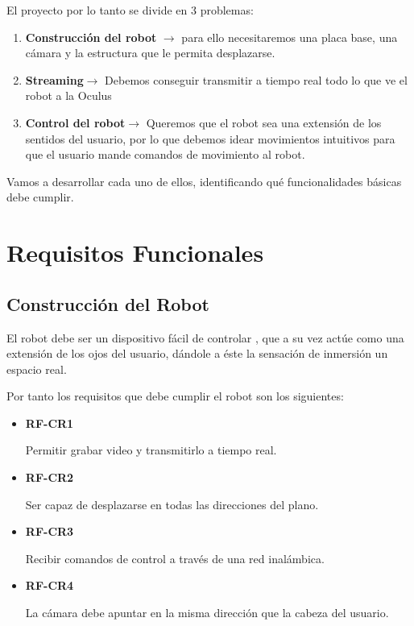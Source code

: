 \documentclass[twoside, 12pt]{epstfg}
\begin{document}
El proyecto por lo tanto se divide en 3 problemas:
\begin{enumerate}
	\item \textbf{Construcción del robot} $\rightarrow$ para ello necesitaremos una placa base, una cámara y la estructura que le permita desplazarse.
	\item \textbf{Streaming}$\rightarrow$ Debemos conseguir transmitir a tiempo real todo lo que ve el robot a la Oculus
	\item \textbf{Control del robot}$\rightarrow$ Queremos que el robot sea una extensión de los sentidos del usuario, por lo que debemos idear movimientos intuitivos para que el usuario mande comandos de movimiento al robot.
\end{enumerate}

Vamos a desarrollar cada uno de ellos, identificando qué funcionalidades básicas debe cumplir.

\section{Requisitos Funcionales}

\subsection{Construcción del Robot}


El robot debe ser un dispositivo fácil de controlar , que a su vez actúe como una extensión de los ojos del usuario, dándole a éste la sensación de inmersión un espacio real.

Por tanto los requisitos que debe cumplir el robot son los siguientes:


\begin{itemize}
	\item \textbf{RF-CR1}
	
	Permitir grabar video y transmitirlo a tiempo real.
	
	
	\item\textbf{RF-CR2} 
	
	Ser capaz de desplazarse en todas las direcciones del plano.
	
	
	\item\textbf{RF-CR3}
	
	Recibir comandos de control a través de una red inalámbica.
	
	
	\item\textbf{RF-CR4} 
	
	La cámara debe apuntar en la misma dirección que la cabeza del usuario.
\end{itemize}
\end{document}
